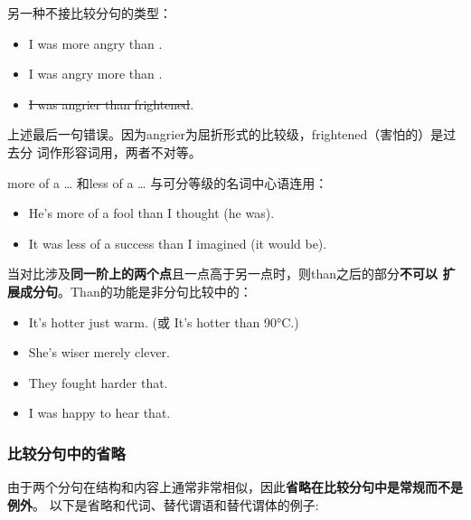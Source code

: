 另一种不接比较分句的类型：
\begin{itemize}
\item I was more angry than .
\item I was angry more  than .

\item \sout{I was angrier than frightened}.
\end{itemize}
上述最后一句错误。因为angrier为屈折形式的比较级，frightened（害怕的）是过去分
词作形容词用，两者不对等。

more of a \ldots{} 和less of a \ldots{} 与可分等级的名词中心语连用：
\begin{itemize}
\item He's more of a fool than I thought (he was).

\item It was less of a success than I imagined (it would be).
\end{itemize}

当对比涉及\textbf{同一阶上的两个点}且一点高于另一点时，则than之后的部分\textbf{不可以
扩展成分句}。Than的功能是非分句比较中的：
\begin{itemize}
\item It's hotter  just warm. (或 It's hotter than 90°C.)
\item She's wiser  merely clever.
\item They fought harder  that.
\item I was  happy to hear that.
\end{itemize}

\subsubsection{比较分句中的省略}

由于两个分句在结构和内容上通常非常相似，因此\textbf{省略在比较分句中是常规而不是例外}。
以下是省略和代词、替代谓语和替代谓体的例子:

